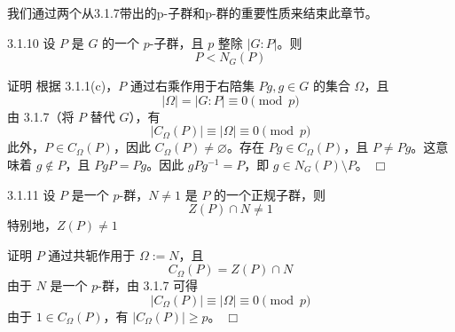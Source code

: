 \documentclass[UTF8]{ctexart}
\begin{document}
我们通过两个从3.1.7带出的p-子群和p-群的重要性质来结束此章节。

3.1.10
设 $P$ 是 $G$ 的一个 $p$-子群，且 $p$ 整除 $|G : P|$。则
$$
    P < N_G(P)
$$

证明
根据 3.1.1(c)，$P$ 通过右乘作用于右陪集 $Pg, g \in G$ 的集合 $\Omega$，且
$$
    |\Omega| = |G : P| \equiv 0 \pmod{p}
$$
由 3.1.7（将 $P$ 替代 $G$），有
$$
    |C_\Omega(P)| \equiv |\Omega| \equiv 0 \pmod{p}
$$
此外，$P \in C_\Omega(P)$，因此 $C_\Omega(P) \neq \varnothing$。存在 $Pg \in C_\Omega(P)$，且 $P \neq Pg$。这意味着 $g \notin P$，且 $PgP = Pg$。因此 $gPg^{-1} = P$，即 $g \in N_G(P) \setminus P$。 $\Box$


3.1.11
设 $P$ 是一个 $p$-群，$N \neq 1$ 是 $P$ 的一个正规子群，则
$$
    Z(P) \cap N \neq 1
$$
特别地，$Z(P) \neq 1$

证明
$P$ 通过共轭作用于 $\Omega := N$，且
$$
    C_\Omega(P) = Z(P) \cap N
$$
由于 $N$ 是一个 $p$-群，由 3.1.7 可得
$$
    |C_\Omega(P)| \equiv |\Omega| \equiv 0 \pmod{p}
$$
由于 $1 \in C_\Omega(P)$，有 $|C_\Omega(P)| \geq p$。 $\Box$







\end{document}

